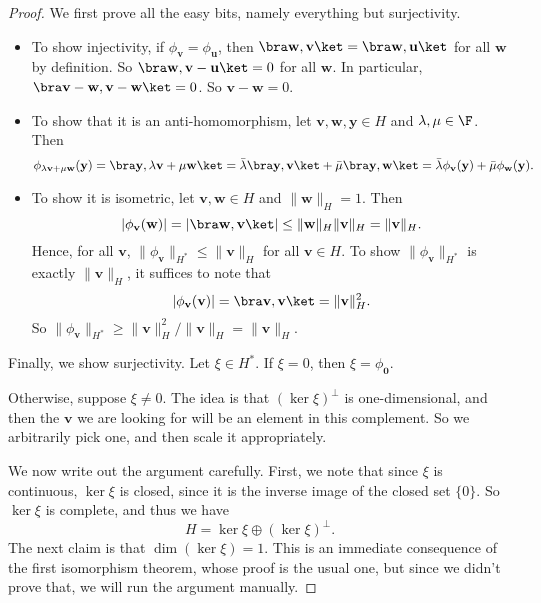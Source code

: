 \documentclass[a4paper]{article}
\begin{document}
\begin{proof}
  We first prove all the easy bits, namely everything but surjectivity.
  \begin{itemize}
    \item To show injectivity, if $\phi_{\mathbf{v}} = \phi_{\mathbf{u}}$, then $\bra \mathbf{w}, \mathbf{v}\ket = \bra \mathbf{w}, \mathbf{u}\ket$ for all $\mathbf{w}$ by definition. So $\bra \mathbf{w}, \mathbf{v} - \mathbf{u}\ket = 0$ for all $\mathbf{w}$. In particular, $\bra \mathbf{v} - \mathbf{w}, \mathbf{v} - \mathbf{w}\ket = 0$. So $\mathbf{v} - \mathbf{w} = 0$.

    \item To show that it is an anti-homomorphism, let $\mathbf{v}, \mathbf{w}, \mathbf{y} \in H$ and $\lambda, \mu \in \F$. Then
      \[
        \phi_{\lambda\mathbf{v} + \mu \mathbf{w}}(\mathbf{y}) = \bra \mathbf{y}, \lambda \mathbf{v} + \mu \mathbf{w}\ket = \bar{\lambda} \bra \mathbf{y}, \mathbf{v}\ket + \bar{\mu}\bra \mathbf{y}, \mathbf{w}\ket = \bar{\lambda} \phi_{\mathbf{v}}(\mathbf{y}) + \bar{\mu} \phi_{\mathbf{w}} (\mathbf{y}).
      \]
    \item To show it is isometric, let $\mathbf{v}, \mathbf{w} \in H$ and $\|\mathbf{w}\|_H = 1$. Then
      \[
        |\phi_\mathbf{v}(\mathbf{w})| = |\bra \mathbf{w}, \mathbf{v}\ket| \leq \|\mathbf{w}\|_H \|\mathbf{v}\|_H = \|\mathbf{v}\|_H.
      \]
      Hence, for all $\mathbf{v}$, $\|\phi_\mathbf{v}\|_{H^*} \leq \|\mathbf{v}\|_H$ for all $\mathbf{v} \in H$. To show $\|\phi_\mathbf{v}\|_{H^*}$ is exactly $\|\mathbf{v}\|_H$, it suffices to note that
      \[
        |\phi_\mathbf{v}(\mathbf{v})| = \bra \mathbf{v}, \mathbf{v}\ket = \|\mathbf{v}\|_H^2.
      \]
      So $\|\phi_\mathbf{v}\|_{H^*} \geq \|\mathbf{v}\|_H^2 /\|\mathbf{v}\|_H = \|\mathbf{v}\|_H$.
  \end{itemize}

  Finally, we show surjectivity. Let $\xi \in H^*$. If $\xi = 0$, then $\xi = \phi_{\mathbf{0}}$.

  Otherwise, suppose $\xi \not= 0$. The idea is that $(\ker \xi)^\perp$ is one-dimensional, and then the $\mathbf{v}$ we are looking for will be an element in this complement. So we arbitrarily pick one, and then scale it appropriately.

  We now write out the argument carefully. First, we note that since $\xi$ is continuous, $\ker \xi$ is closed, since it is the inverse image of the closed set $\{0\}$. So $\ker \xi$ is complete, and thus we have
  \[
    H = \ker \xi \oplus (\ker \xi)^\perp.
  \]
  The next claim is that $\dim (\ker \xi) = 1$. This is an immediate consequence of the first isomorphism theorem, whose proof is the usual one, but since we didn't prove that, we will run the argument manually.


\end{proof}
\end{document}

